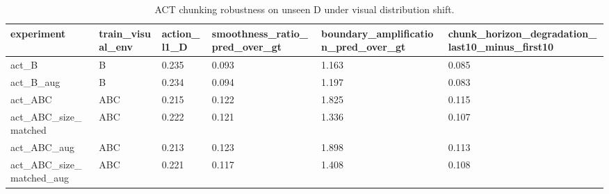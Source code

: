\begin{table}[t]
\centering
\caption{ACT chunking robustness on unseen D under visual distribution shift.}
\label{tab:act-chunk-robustness-shift}
\begin{tabular}{llllll}
\toprule
experiment & train\_visual\_env & action\_l1\_D & smoothness\_ratio\_pred\_over\_gt & boundary\_amplification\_pred\_over\_gt & chunk\_horizon\_degradation\_last10\_minus\_first10 \\
\midrule
act\_B & B & 0.235 & 0.093 & 1.163 & 0.085 \\
act\_B\_aug & B & 0.234 & 0.094 & 1.197 & 0.083 \\
act\_ABC & ABC & 0.215 & 0.122 & 1.825 & 0.115 \\
act\_ABC\_size\_matched & ABC & 0.222 & 0.121 & 1.336 & 0.107 \\
act\_ABC\_aug & ABC & 0.213 & 0.123 & 1.898 & 0.113 \\
act\_ABC\_size\_matched\_aug & ABC & 0.221 & 0.117 & 1.408 & 0.108 \\
\bottomrule
\end{tabular}
\end{table}
